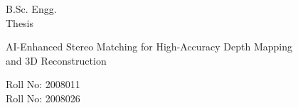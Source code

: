 \documentclass[12pt, landscape, a4paper]{article}
\begin{document}
\vspace*{\fill}
\noindent
\begin{minipage}{\textwidth}
\bfseries\fontsize{13}{22}\selectfont
\begin{minipage}[t]{0.18\textwidth}
\raggedright
B.Sc. Engg.\\
Thesis
\end{minipage}%
\begin{minipage}[t]{0.64\textwidth}
\centering
AI-Enhanced Stereo Matching for High-Accuracy Depth Mapping\\
and 3D Reconstruction
\end{minipage}%
\begin{minipage}[t]{0.18\textwidth}
\raggedleft
Roll No: 2008011\\
Roll No: 2008026
\end{minipage}
\end{minipage}
\vspace*{\fill}
\end{document}
